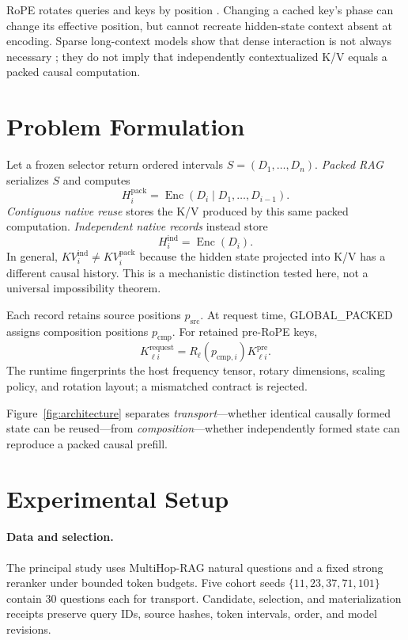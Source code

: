 \documentclass[11pt]{article}
\begin{document}
RoPE rotates queries and keys by position \cite{su2021roformer}. Changing a
cached key's phase can change its effective position, but cannot recreate
hidden-state context absent at encoding. Sparse long-context models show that
dense interaction is not always necessary
\cite{beltagy2020longformer,zaheer2020bigbird,roy2021routing}; they do not imply
that independently contextualized K/V equals a packed causal computation.

\section{Problem Formulation}

Let a frozen selector return ordered intervals $S=(D_1,\ldots,D_n)$.
\emph{Packed RAG} serializes $S$ and computes
\[
H_i^{\mathrm{pack}}=\operatorname{Enc}(D_i\mid D_1,\ldots,D_{i-1}).
\]
\emph{Contiguous native reuse} stores the K/V produced by this same packed
computation. \emph{Independent native records} instead store
\[
H_i^{\mathrm{ind}}=\operatorname{Enc}(D_i).
\]
In general, $KV_i^{\mathrm{ind}}\neq KV_i^{\mathrm{pack}}$ because the hidden
state projected into K/V has a different causal history. This is a mechanistic
distinction tested here, not a universal impossibility theorem.

Each record retains source positions $p_{\mathrm{src}}$. At request time,
GLOBAL\_PACKED assigns composition positions $p_{\mathrm{cmp}}$. For retained
pre-RoPE keys,
\[
K^{\mathrm{request}}_{\ell i}=R_\ell(p_{\mathrm{cmp},i})K^{\mathrm{pre}}_{\ell i}.
\]
The runtime fingerprints the host frequency tensor, rotary dimensions, scaling
policy, and rotation layout; a mismatched contract is rejected.

Figure~\ref{fig:architecture} separates \emph{transport}---whether identical
causally formed state can be reused---from \emph{composition}---whether
independently formed state can reproduce a packed causal prefill.

\section{Experimental Setup}

\paragraph{Data and selection.}
The principal study uses MultiHop-RAG natural questions and a fixed strong
reranker under bounded token budgets. Five cohort seeds
$\{11,23,37,71,101\}$ contain 30 questions each for transport. Candidate,
selection, and materialization receipts preserve query IDs, source hashes,
token intervals, order, and model revisions.
\end{document}
